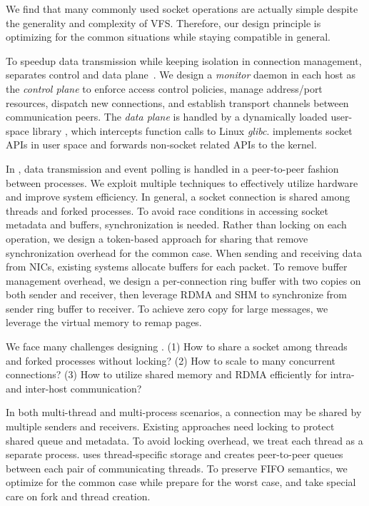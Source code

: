 We find that many commonly used socket operations are actually simple despite the generality and complexity of VFS. Therefore, our design principle is optimizing for the common situations while staying compatible in general.

To speedup data transmission while keeping isolation in connection management, \sys{} separates control and data plane~\cite{peter2016arrakis}.
We design a \emph{monitor} daemon in each host as the \emph{control plane} to enforce access control policies, manage address/port resources, dispatch new connections, and establish transport channels between communication peers.
The \emph{data plane} is handled by a dynamically loaded user-space library \libipc{}, which intercepts function calls to Linux \emph{glibc}. \libipc{} implements socket APIs in user space and forwards non-socket related APIs to the kernel.


In \sys{}, data transmission and event polling is handled in a peer-to-peer fashion between processes.
We exploit multiple techniques to effectively utilize hardware and improve system efficiency.
In general, a socket connection is shared among threads and forked processes.
To avoid race conditions in accessing socket metadata and buffers, synchronization is needed. Rather than locking on each operation, we design a token-based approach for sharing that remove synchronization overhead for the common case.
When sending and receiving data from NICs, existing systems allocate buffers for each packet.
To remove buffer management overhead, we design a per-connection ring buffer with two copies on both sender and receiver, then leverage RDMA and SHM to synchronize from sender ring buffer to receiver.
To achieve zero copy for large messages, we leverage the virtual memory to remap pages.

\iffalse

We face many challenges designing \sys{}. 
(1) How to share a socket among threads and forked processes without locking?
(2) How to scale to many concurrent connections?
(3) How to utilize shared memory and RDMA efficiently for intra- and inter-host communication?

In both multi-thread and multi-process scenarios, a connection may be shared by multiple senders and receivers.
Existing approaches need locking to protect shared queue and metadata.
To avoid locking overhead, we treat each thread as a separate process.
\libipc{} uses thread-specific storage and creates peer-to-peer queues between each pair of communicating threads.
To preserve FIFO semantics, we optimize for the common case while prepare for the worst case, and take special care on fork and thread creation.

